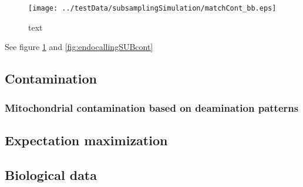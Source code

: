 \documentclass[a4paper,12pt]{article}
\begin{document}
\begin{figure}[H]
\centering
\texttt{[image: ../testData/subsamplingSimulation/matchCont\_bb.eps]} 
\caption{text}
\label{fig:endocallingSUBendo}
\end{figure}

See figure \ref{fig:endocallingSUBendo} and \ref{fig:endocallingSUBcont}




%
\clearpage


\subsection{Contamination}
\label{sec:res:cont}

\subsubsection{Mitochondrial contamination based on deamination patterns}
\label{sec:res:contdeam}








\subsection{Expectation maximization}


\subsection{Biological data}

\end{document}
